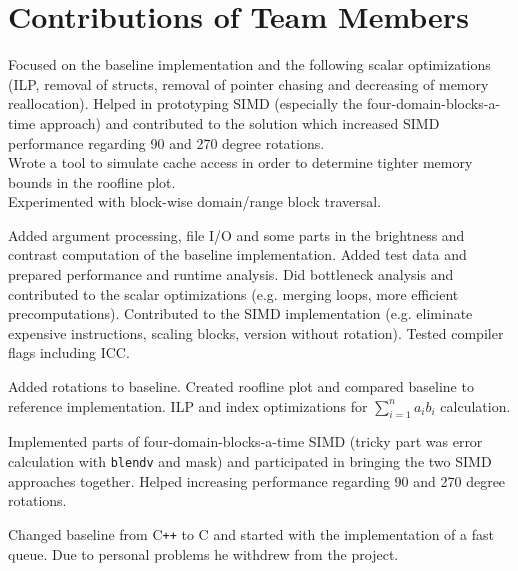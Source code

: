 \section{Contributions of Team Members}

\hspace{\parindent} Focused on the baseline implementation and the following scalar
optimizations (ILP, removal of structs, removal of pointer chasing and
decreasing of memory reallocation). Helped in prototyping SIMD (especially the
four-domain-blocks-a-time approach)
and contributed to the solution which increased SIMD performance regarding 90 and 270 degree rotations.\\
Wrote a tool to simulate cache access in order to determine tighter memory bounds in the roofline plot.\\
Experimented with block-wise domain/range block traversal.

 Added argument processing, file I/O and some parts in the
brightness and contrast computation of the baseline implementation. Added test
data and prepared performance and runtime analysis. Did bottleneck analysis and
contributed to the scalar optimizations (e.g. merging loops, more efficient
precomputations). Contributed to the SIMD implementation (e.g. eliminate
expensive instructions, scaling blocks, version without rotation). Tested
compiler flags including ICC.

 Added rotations to baseline. Created roofline plot and compared baseline to reference
implementation. ILP and index optimizations for $\sum_{i=1}^n a_i b_i$ calculation.

Implemented parts of four-domain-blocks-a-time SIMD (tricky part was error calculation with
\verb|blendv| and mask) and participated in bringing the two SIMD approaches together.
Helped increasing performance regarding 90 and 270 degree rotations.

 Changed baseline from C\texttt{++} to C and started with the implementation of a fast queue.
Due to personal problems he withdrew from the project.

